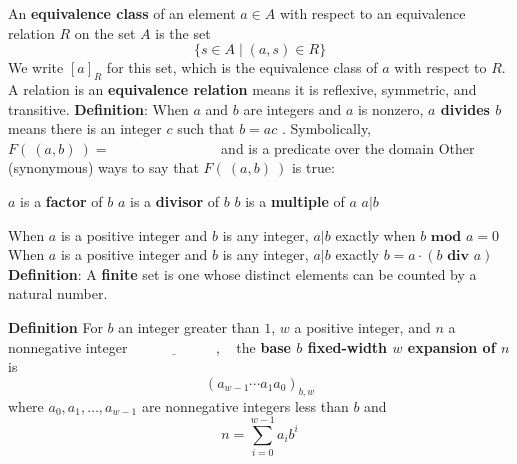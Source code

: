 \documentclass[12pt, oneside]{article}
\begin{document}
An {\bf equivalence class} of an element $a \in A$ 
with respect to an equivalence relation $R$ on the set $A$ is the set 
\[
    \{s \in A \mid (a, s) \in R \}
\] 
We write $[a]_R$ for this set, which is the equivalence class of $a$ with respect to $R$.
A relation is an {\bf equivalence relation} means it is reflexive, symmetric, and transitive.
{\bf Definition}: When $a$ and $b$ are integers and $a$ is nonzero, 
{\bf $a$ divides $b$} means there is an integer $c$ such that $b = ac$ . 
Symbolically, $F(~(a,b)~) = \phantom{\exists c\in \mathbb{Z}~(b=ac)}$
and is  a predicate over the domain \underline{}
Other (synonymous) ways to say that $F(~(a,b)~)$ is true: 
\begin{center}
$a$ is a {\bf factor} of $b$
\qquad 
$a$ is a {\bf divisor} of $b$
\qquad  $b$ is a {\bf multiple} of $a$
\qquad
$a | b$
\end{center}
When $a$ is a positive integer and $b$ is any integer, $a | b$
exactly when $b \textbf{ mod } a = 0$
When $a$ is a positive integer and $b$ is any integer, $a | b$
exactly $b = a \cdot (b \textbf{ div } a)$
{\bf Definition}: A {\bf finite} set is one whose distinct elements can be counted by a natural number.

{\bf Definition} For $b$ an integer greater than $1$, $w$ a positive integer, 
and $n$ a nonnegative integer
$\underline{\phantom{\hspace{1in}}}$, ~
the {\bf base $b$ fixed-width $w$ expansion of $n$}  is
\[
(a_{w-1} \cdots a_1 a_0)_{b,w}
\]
where  $a_0, a_1, \ldots, a_{w-1}$ are nonnegative integers less than $b$ and
\[
n =  \sum_{i=0}^{w-1} a_{i} b^{i}
\]
\end{document}
